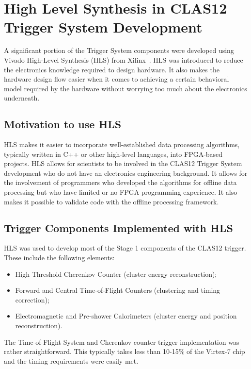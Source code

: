 \section{High Level Synthesis in CLAS12 Trigger System Development}
\label{sec:hls}

A significant portion of the Trigger System components were developed using Vivado High-Level Synthesis
(HLS) from Xilinx~\cite{hls-ref}. HLS was introduced to reduce the electronics knowledge required to design
hardware. It also makes the hardware design flow easier when it comes to achieving a certain behavioral model
required by the hardware without worrying too much about the electronics underneath.

\subsection{Motivation to use HLS}

HLS makes it easier to incorporate well-established data processing algorithms, typically written in C++ or
other high-level languages, into FPGA-based projects. HLS allows for scientists to be involved in the CLAS12
Trigger System development who do not have an electronics engineering background. It allows for the
involvement of programmers who developed the algorithms for offline data processing but who have limited or
no FPGA programming experience. It also makes it possible to validate code with the offline processing
framework.

\subsection{Trigger Components Implemented with HLS}

HLS was used to develop most of the Stage 1 components of the CLAS12 trigger. These include the following
elements:

\begin{itemize}
	\item High Threshold Cherenkov Counter (cluster energy reconstruction);
	\item Forward and Central Time-of-Flight Counters (clustering and timing correction);
	\item Electromagnetic and Pre-shower Calorimeters (cluster energy and position reconstruction).
\end{itemize}

The Time-of-Flight System and Cherenkov counter trigger implementation was rather straightforward. This
typically takes less than 10-15\% of the Virtex-7 chip and the timing requirements were easily met.

